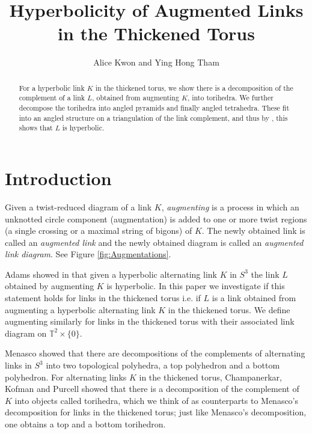 \documentclass[11pt]{amsart}
\title{Hyperbolicity of Augmented Links in the Thickened Torus}
\author[Alice Kwon and Ying Hong Tham]{Alice Kwon and Ying Hong Tham}
\newcommand{\Sp}{{S}}
\newcommand{\torus}{{\mathbb{T}^2}}
\theoremstyle{plain}
\theoremstyle{definition}
\begin{document}
\maketitle

\begin{abstract}
For a hyperbolic link $K$ in the thickened torus,
we show there is a decomposition of the complement of a link $L$,
obtained from augmenting $K$, into torihedra. We further decompose 
the torihedra into angled pyramids and finally angled tetrahedra.
These fit into an angled structure on a triangulation of the link complement,
and thus by \cite{Casson-Rivin}, this shows
that $L$ is hyperbolic.  
\end{abstract}

\section{Introduction}
\label{s:intro}

Given a twist-reduced diagram of a link $K$, \emph{augmenting} is a process in
which an unknotted circle component (augmentation) is added to one or more twist
regions (a single crossing or a maximal string of bigons) of $K$.
The newly obtained link is called an 
\emph{augmented link} and the newly obtained diagram is called an 
\emph{augmented link diagram}. See Figure
\ref{fig:Augmentations}. 


Adams showed in \cite{CA} that given a hyperbolic alternating link $K$ in
$\Sp^3$ the link $L$ obtained by augmenting $K$ is hyperbolic. In this paper we
investigate if this statement holds for links in the thickened torus i.e. if $L$
is a link obtained from augmenting a hyperbolic alternating link $K$ in the
thickened torus. We define augmenting similarly for links in the thickened torus
with their associated link diagram on $\torus \times \{0\}.$ 


Menasco \cite{Menasco} showed that there are decompositions
of the complements of alternating links in $\Sp^3$
into two topological polyhedra,
a top polyhedron and a bottom polyhedron.
For alternating links $K$ in the thickened torus,
Champanerkar, Kofman and Purcell \cite{CKP2}
showed that there is a decomposition of the
complement of $K$ into objects called torihedra, which we think of as
counterparts to Menasco's decomposition %
for links in the thickened torus;
just like Menasco's decomposition, one obtains a top and a bottom torihedron.
\end{document}
